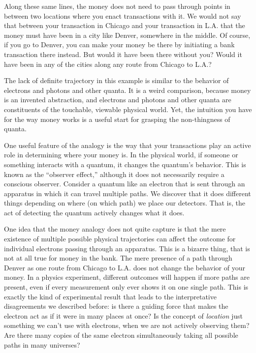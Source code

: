 \documentclass[12pt,onecolumn,preprintnumbers,amsmath,amssymbn,reprint,nofootinbib,superscriptaddress]{revtex4}    %
\begin{document}
Along these same lines, the money does not need to pass through points in between two locations where you enact transactions with it.  We would not say that between your transaction in Chicago and your transaction in L.A. that the money must have been in a city like Denver, somewhere in the middle.  Of course, if you go to Denver, you can make your money be there by initiating a bank transaction there instead.  But would it have been there without you?  Would it have been in any of the cities along any route from Chicago to L.A.?

The lack of definite trajectory in this example is similar to the behavior of electrons and photons and other quanta.  It is a weird comparison, because money is an invented abstraction, and electrons and photons and other quanta are constituents of the touchable, viewable physical world.  Yet, the intuition you have for the way money works is a useful start for grasping the non-thingness of quanta.

One useful feature of the analogy is the way that your transactions play an active role in determining where your money is.  In the physical world, if someone or something interacts with a quantum, it changes the quantum's behavior. This is known as the ``observer effect,'' although it does not necessarily require a conscious observer.  Consider a quantum like an electron that is sent through an apparatus in which it can travel multiple paths.  We discover that it does different things depending on where (on which path) we place our detectors.  That is, the act of detecting the quantum actively changes what it does.

One idea that the money analogy does not quite capture is that the mere existence of multiple possible physical trajectories can affect the outcome for individual electrons passing through an apparatus.  This is a bizarre thing, that is not at all true for money in the bank.  The mere presence of a path through Denver as one route from Chicago to L.A. does not change the behavior of your money.  In a physics experiment, different outcomes will happen if more paths are present, even if every measurement only ever shows it on one single path.  This is exactly the kind of experimental result that leads to the interpretative disagreements we described before:  is there a guiding force that makes the electron act as if it were in many places at once?  Is the concept of {\em location} just something we can't use with electrons, when we are not actively observing them?  Are there many copies of the same electron simultaneously taking all possible paths in many universes?  
\end{document}
